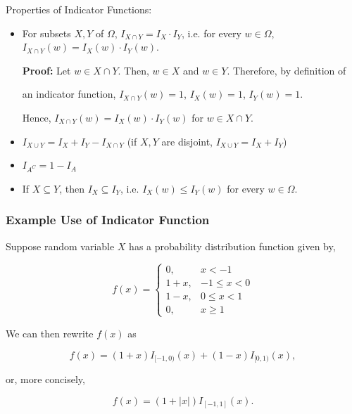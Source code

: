 \documentclass[12pt]{article}
\begin{document}
\noindent
Properties of Indicator Functions:

\begin{itemize}
\item For subsets $X, Y$ of $\Omega$, $I_{X \cap Y}=I_X \cdot I_Y$, i.e. for every $w \in \Omega$, $I_{X \cap Y}(w)=I_X(w) \cdot I_Y(w)$.

\begin{adjustwidth}{2.5em}{0pt}
\textbf{Proof:} Let $w \in X \cap Y$. Then, $w \in X$ and $w \in Y$. Therefore, by definition of 

\hspace{1.3cm} an indicator function, $I_{X \cap Y}(w)=1$, $I_{X}(w)=1$, $I_{Y}(w)=1$. 

\hspace{1.3cm} Hence, $I_{X \cap Y}(w) = I_X(w) \cdot I_Y(w)$ for $w \in X \cap Y$.
\end{adjustwidth}

\item $I_{X \cup Y}=I_X + I_Y - I_{X \cap Y}$ (if $X,Y$ are disjoint, $I_{X \cup Y}=I_X + I_Y$)
\item $I_{A^C}=1-I_A$
\item If $X \subseteq Y$, then $I_X \subseteq I_Y$, i.e. $I_X(w) \leq I_Y(w)$ for every $w \in \Omega$.
\end{itemize}

\subsubsection*{Example Use of Indicator Function}
\begin{tcolorbox}
\noindent
Suppose random variable $X$ has a probability distribution function given by, 

\begin{equation*}
f(x) =  \begin{cases} 
      0, & x < -1 \\
      1+x, & -1 \leq x < 0 \\
      1-x, & 0 \leq x < 1\\
      0, & x \geq 1
   \end{cases}
\end{equation*}

\noindent
We can then rewrite $f(x)$ as 

\begin{equation*}
f(x) = (1+x)I_{[-1,0)}(x) + (1-x)I_{[0,1)}(x),
\end{equation*}

\noindent
or, more concisely,

\begin{equation*}
f(x) = (1+|x|)I_{[-1,1]}(x).
\end{equation*}
\end{tcolorbox}
\end{document}
